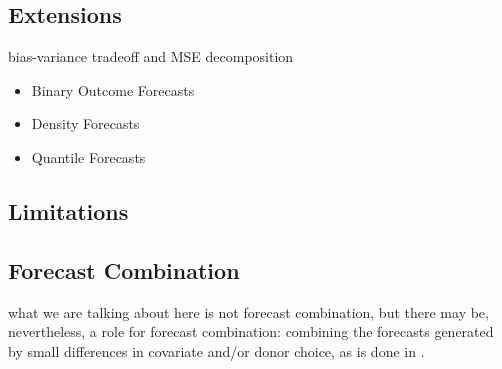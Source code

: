 \documentclass[11pt]{article}
\theoremstyle{definition}
\begin{document}
\subsection{Extensions}\label{Extensions}
bias-variance tradeoff and MSE decomposition\\

\begin{itemize}
  \item Binary Outcome Forecasts
  \item Density Forecasts
  \item Quantile Forecasts
\end{itemize}

\subsection{Limitations}\label{Limitations}

\subsection{Forecast Combination}
what we are talking about here is not forecast combination, but there may be, nevertheless, a role for forecast combination: combining the forecasts generated by small differences in covariate and/or donor choice, as is done in \cite{lundquist2024volatility}. \\

\clearpage



 
\end{document}
